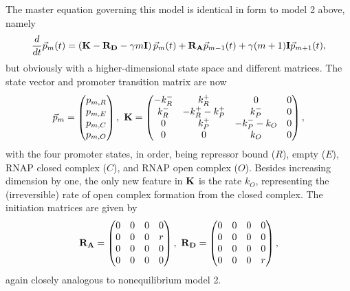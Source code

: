 The master equation governing this model is identical in form to model 2 above,
namely
\begin{equation}
\frac{d {}}{d t}\vec{p}_m(t) =
\left( \mathbf{K} - \mathbf{R_D} - \gamma m \mathbf{I} \right) \vec{p}_m(t)
                + \mathbf{R_A} \vec{p}_{m-1}(t) +
                \gamma (m+1) \mathbf{I} \vec{p}_{m+1}(t),
\end{equation}
but obviously with a higher-dimensional state space and different matrices. The
state vector and promoter transition matrix are now
\begin{equation}
\vec{p}_m = \begin{pmatrix} p_{m,R} \\ p_{m,E} \\
                             p_{m,C} \\ p_{m,O}\end{pmatrix},\
\mathbf{K} = \begin{pmatrix} -k_R^- & k_R^+ & 0 & 0\\
                        k_R^- & -k_R^+ -k_P^+ & k_P^- & 0 \\
                        0 & k_P^+ & -k_P^- - k_O & 0 \\
                        0 & 0 & k_O & 0
                \end{pmatrix},
\end{equation}
with the four promoter states, in order, being repressor bound ($R$), empty
($E$), RNAP closed complex ($C$), and RNAP open complex ($O$). Besides
increasing dimension by one, the only new feature in $\mathbf{K}$ is the
rate $k_O$, representing the (irreversible) rate of open complex formation from
the closed complex. The initiation matrices are given by
\begin{equation}
\mathbf{R_A} = \begin{pmatrix}
        0 & 0 & 0 & 0 \\ 
        0 & 0 & 0 & r \\ 
        0 & 0 & 0 & 0 \\ 
        0 & 0 & 0 & 0
                \end{pmatrix},\
\mathbf{R_D} = \begin{pmatrix}
        0 & 0 & 0 & 0 \\ 
        0 & 0 & 0 & 0 \\ 
        0 & 0 & 0 & 0 \\ 
        0 & 0 & 0 & r
                \end{pmatrix},
\end{equation}
again closely analogous to nonequilibrium model 2.

